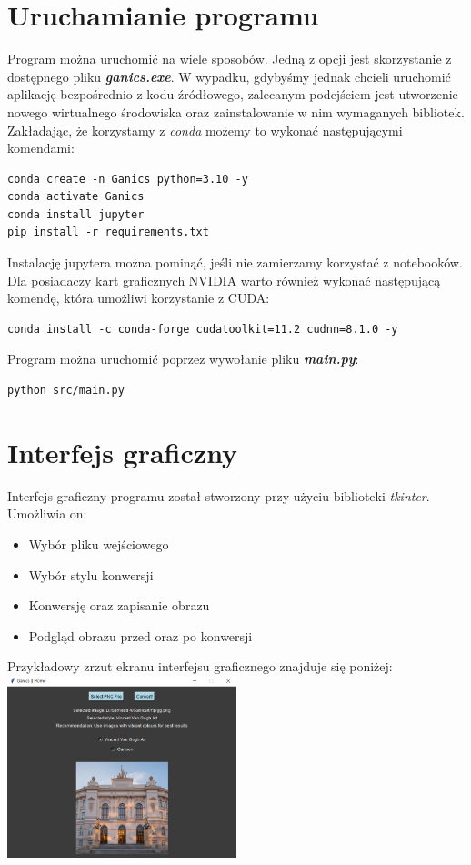 \documentclass{article}
\begin{document}
\section{Uruchamianie programu}
Program można uruchomić na wiele sposobów. Jedną z opcji jest skorzystanie z dostępnego pliku \textbf{\textit{ganics.exe}}.
W wypadku, gdybyśmy jednak chcieli uruchomić aplikację bezpośrednio z kodu źródłowego, zalecanym podejściem jest utworzenie nowego wirtualnego środowiska oraz zainstalowanie w nim wymaganych bibliotek.
Zakładając, że korzystamy z \textit{conda} możemy to wykonać następującymi komendami:
\begin{verbatim}
conda create -n Ganics python=3.10 -y
conda activate Ganics
conda install jupyter
pip install -r requirements.txt
\end{verbatim}
Instalację jupytera można pominąć, jeśli nie zamierzamy korzystać z notebooków.
\vspace{3mm} \\
Dla posiadaczy kart graficznych NVIDIA warto również wykonać następującą komendę, która umożliwi korzystanie z CUDA:
\begin{verbatim}
conda install -c conda-forge cudatoolkit=11.2 cudnn=8.1.0 -y
\end{verbatim}
Program można uruchomić poprzez wywołanie pliku \textbf{\textit{main.py}}:
\begin{verbatim}
python src/main.py
\end{verbatim}

\section{Interfejs graficzny}
Interfejs graficzny programu został stworzony przy użyciu biblioteki \textit{tkinter}. Umożliwia on:
\begin{itemize}
    \setlength\itemsep{0pt}
    \item Wybór pliku wejściowego
    \item Wybór stylu konwersji
    \item Konwersję oraz zapisanie obrazu
    \item Podgląd obrazu przed oraz po konwersji
\end{itemize}
Przykładowy zrzut ekranu interfejsu graficznego znajduje się poniżej:
\vspace{3mm} \\
\includegraphics[width=0.5\textwidth]{../imgs/gui.png}
\end{document}
